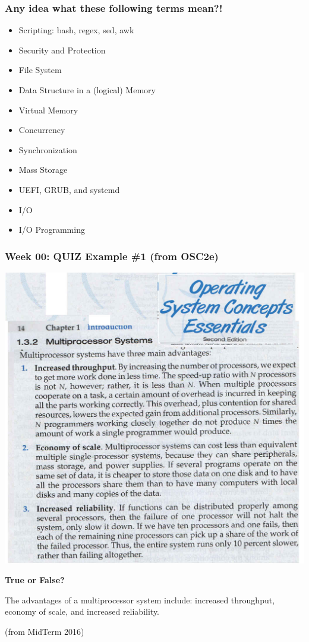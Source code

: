 \documentclass[aspectratio=169, xcolor=table, notheorems, hyperref={pdfpagelabels=false}]{beamer}
\begin{document}
\begin{frame}
\frametitle{Any idea what these following terms mean?!}
\begin{itemize}
\item Scripting: bash, regex, sed, awk
\item Security and Protection
\item File System
\item Data Structure in a (logical) Memory
\item Virtual Memory
\item Concurrency
\item Synchronization
\item Mass Storage
\item UEFI, GRUB, and systemd
\item I/O
\item I/O Programming
\end{itemize}
\end{frame}

\begin{frame}
\frametitle{Week 00: QUIZ Example \#1 (from OSC2e)}
\begin{multicols}{2}

\includegraphics[width=0.97\linewidth]{os00-osc2e}

\columnbreak
  \null \vfill 

  \textbf{True or False?}

  The advantages of a multiprocessor system include: 
  increased throughput, economy of scale, and increased reliability.

  {\footnotesize (from MidTerm 2016)}
  \vfill \null
\end{multicols}
\end{frame}
\end{document}
